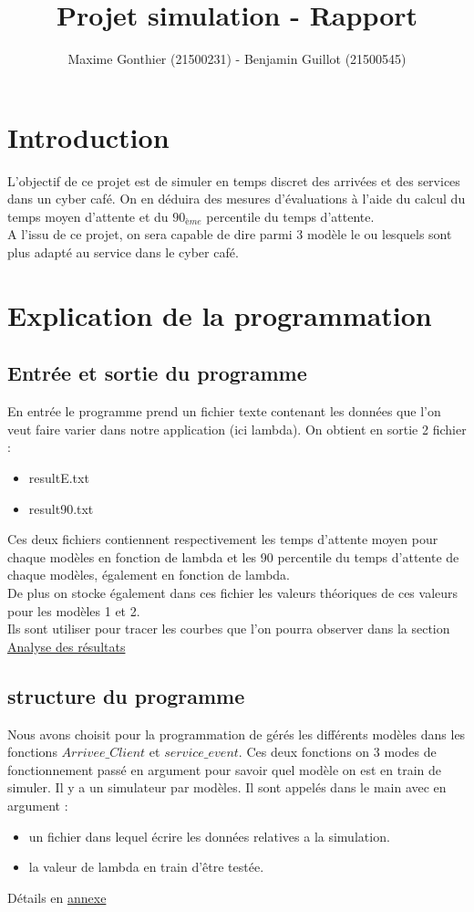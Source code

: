 \documentclass[a4paper,11pt]{article}
\title{Projet simulation - Rapport}
\author{Maxime Gonthier (21500231) - Benjamin Guillot (21500545)}
\begin{document}
\clearpage
\maketitle

\newpage
\tableofcontents

\newpage
\section{Introduction}
	L'objectif de ce projet est de simuler en temps discret des arrivées et des services dans un cyber café. On en déduira des mesures d'évaluations à l'aide du calcul du temps moyen d'attente et du $90_{ème}$ percentile du temps d'attente.\\
	A l'issu de ce projet, on sera capable de dire parmi 3 modèle le ou lesquels sont plus adapté au service dans le cyber café.
\newpage
\section{Explication de la programmation}
	\subsection{Entrée et sortie du programme}
	En entrée le programme prend un fichier texte contenant les données que l'on veut faire varier dans notre application (ici lambda).
	On obtient en sortie 2 fichier :
	\begin{itemize}
		\item resultE.txt
		\item result90.txt
	\end{itemize}
	Ces deux fichiers contiennent respectivement les temps d'attente moyen pour chaque modèles en fonction de lambda et les 90 percentile du temps d'attente de chaque modèles, également en fonction de lambda.\\
	De plus on stocke également dans ces fichier les valeurs théoriques de ces valeurs pour les modèles 1 et 2.\\
	Ils sont utiliser pour tracer les courbes que l'on pourra observer dans la section \hyperref[Analyse des résultats]{Analyse des résultats}
	\subsection{structure du programme}
	Nous avons choisit pour la programmation de gérés les différents modèles dans les fonctions $Arrivee\_Client$ et $service\_event$. Ces deux fonctions on 3 modes de fonctionnement
	passé en argument pour savoir quel modèle on est en train de simuler. Il y a un simulateur par modèles.
	Il sont appelés dans le main avec en argument :
	\begin{itemize}
		\item un fichier dans lequel écrire les données relatives a la simulation.
		\item la valeur de lambda en train d'être testée.
	\end{itemize}
	Détails en \hyperref[annexe]{annexe}
\end{document}
